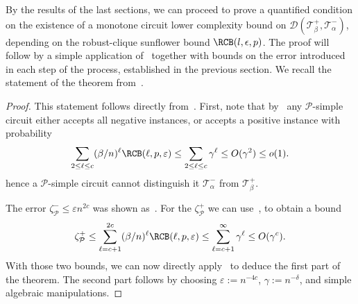 By the results of the last sections, we can proceed to prove a quantified condition on the existence of a monotone circuit lower complexity bound on $\mathcal{D}(\mathcal{T}^+_\beta, \mathcal{T}^-_\alpha)$, depending on the robust-clique sunflower bound $\RCB(l, \epsilon, p)$. The proof will follow by a simple application of~ together with bounds on the error introduced in each step of the process, established in the previous section. We recall the statement of the theorem from~.

\cliqueboundrcb*

\begin{proof}
This statement follows directly from~. First, note that by~ any $\mathcal{P}$-simple circuit either accepts all negative instances, or accepts a positive instance with probability 
\begin{equation*}
    \sum_{2\leq \ell \leq c} (\beta/n)^{\ell} \RCB(\ell, p, \varepsilon) \leq \sum_{2 \leq \ell \leq c} \gamma^\ell \leq O(\gamma^2) \leq o(1).
\end{equation*}
hence a $\mathcal{P}$-simple circuit cannot distinguish it $\mathcal{T}^-_{\alpha}$ from $\mathcal{T}^+_{\beta}$.

The error $\zeta_{\mathcal{P}}^- \leq \varepsilon n^{2c}$ was shown as~. For the $\zeta_{\mathcal{P}}^+$ we can use~, to obtain a bound
\begin{equation*}
    \zeta^+_{\mathcal{P}} \leq \sum_{\ell = c+1}^{2c} (\beta/n)^\ell \RCB(\ell, p, \varepsilon) \leq \sum_{\ell=c+1}^{\infty}\gamma^\ell \leq O(\gamma^{c}).
\end{equation*}
With those two bounds, we can now directly apply~ to deduce the first part of the theorem. The second part follows by choosing $\varepsilon := n^{-4c}$,  $\gamma := n^{-\delta}$, and simple algebraic manipulations.
\end{proof}


